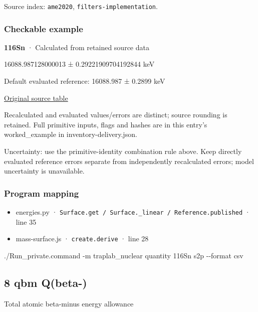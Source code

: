 \documentclass[
  11pt,
  letterpaper,
]{article}
\newenvironment{Shaded}{}{}
\newcommand{\AttributeTok}[1]{\textcolor[rgb]{0.49,0.56,0.16}{#1}}
\newcommand{\ExtensionTok}[1]{#1}
\newcommand{\NormalTok}[1]{#1}
\providecommand{\tightlist}{%
  \setlength{\itemsep}{0pt}\setlength{\parskip}{0pt}}
\begin{document}
Source index: \texttt{ame2020}, \texttt{filters-implementation}.

\subsubsection{Checkable example}\label{checkable-example-6}

\textbf{116Sn} · Calculated from retained source data

16088.987128000013 ± 0.29221909704192844 keV

Default evaluated reference: 16088.987 ± 0.2899 keV

\href{https://www-nds.iaea.org/amdc/ame2020/rct1.mas20.txt}{Original
source table}

Recalculated and evaluated values/errors are distinct; source rounding
is retained. Full primitive inputs, flags and hashes are in this entry's
worked\_example in inventory-delivery.json.

Uncertainty: use the primitive-identity combination rule above. Keep
directly evaluated reference errors separate from independently
recalculated errors; model uncertainty is unavailable.

\subsubsection{Program mapping}\label{program-mapping-6}

\begin{itemize}
\tightlist
\item
  energies.py ·
  \texttt{Surface.get\ /\ Surface.\_linear\ /\ Reference.published} ·
  line 35
\item
  mass-surface.js · \texttt{create.derive} · line 28
\end{itemize}

\begin{Shaded}
\begin{Highlighting}[]
\ExtensionTok{./Run\_private.command} \AttributeTok{{-}m}\NormalTok{ traplab\_nuclear quantity 116Sn s2p }\AttributeTok{{-}{-}format}\NormalTok{ csv}
\end{Highlighting}
\end{Shaded}

\subsection{8 qbm Q(beta-)}\label{qbm-qbeta-}

Total atomic beta-minus energy allowance
\end{document}
